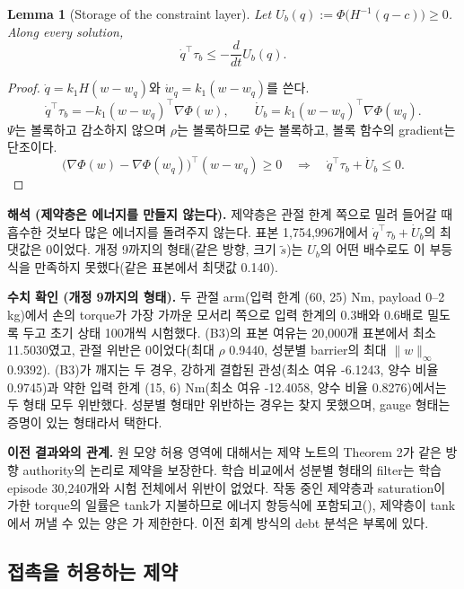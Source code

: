 \documentclass[11pt]{article}\usepackage[margin=1in]{geometry}\usepackage{amsmath,amssymb,amsthm,mathtools}\usepackage{graphicx}\graphicspath{{figures/}{../figures/}{figs/}{./}}\usepackage{enumitem}\usepackage{hyperref}\usepackage{cleveref}\usepackage{tikz}\usetikzlibrary{arrows.meta,positioning,calc,shapes.geometric}\usepackage{float}\usepackage{rotating}\usepackage[most]{tcolorbox}\usepackage{kotex}\usepackage{booktabs}\usepackage{longtable}\emergencystretch=1.6em\tolerance=2000 \crefname{assumption}{Assumption}{Assumptions}\Crefname{assumption}{Assumption}{Assumptions}\crefname{definition}{Definition}{Definitions}\Crefname{definition}{Definition}{Definitions}\crefname{proposition}{Proposition}{Propositions}\Crefname{proposition}{Proposition}{Propositions}\crefname{fact}{Fact}{Facts}\Crefname{fact}{Fact}{Facts} \newtheorem{assumption}{Assumption}\newtheorem{definition}{Definition}\newtheorem{lemma}{Lemma}\newtheorem{proposition}{Proposition}\newtheorem{theorem}{Theorem}\newtheorem{corollary}{Corollary}\newtheorem{fact}{Fact}\theoremstyle{remark}\newtheorem{remark}{Remark} \newcommand{\R}{\mathbb{R}}\newcommand{\xb}{\bar x}\newcommand{\Ab}{\bar A}\newcommand{\By}{\bar B_y}\newcommand{\U}{\mathcal U}\newcommand{\Z}{\mathcal Z}
\begin{document}
\begin{lemma}[Storage of the constraint layer]
\label{lem:barrier}
Let $U_b(q):=\Phi\big(H^{-1}(q-c)\big)\ge0$. Along every solution,
\[
\dot q^\top\tau_b\le-\frac{d}{dt}U_b(q) .
\]
\end{lemma}

\begin{proof}
$\dot q=k_1H(w-w_q)$와 $\dot w_q=k_1(w-w_q)$를 쓴다.
\[
\dot q^\top\tau_b=-k_1(w-w_q)^\top\nabla\Phi(w),\qquad \dot U_b=k_1(w-w_q)^\top\nabla\Phi(w_q) .
\]
$\Psi$는 볼록하고 감소하지 않으며 $\rho$는 볼록하므로 $\Phi$는 볼록하고, 볼록 함수의 gradient는 단조이다.
\[
\big(\nabla\Phi(w)-\nabla\Phi(w_q)\big)^\top(w-w_q)\ge0\quad\Longrightarrow\quad \dot q^\top\tau_b+\dot U_b\le0 .
\]
\end{proof}

\textbf{해석 (제약층은 에너지를 만들지 않는다).} 제약층은 관절 한계 쪽으로 밀려 들어갈 때 흡수한 것보다 많은 에너지를 돌려주지 않는다. 표본 1{,}754{,}996개에서 $\dot q^\top\tau_b+\dot U_b$의 최댓값은 0이었다. 개정 9까지의 형태(같은 방향, 크기 $\tilde s$)는 $U_b$의 어떤 배수로도 이 부등식을 만족하지 못했다(같은 표본에서 최댓값 0.140).

\textbf{수치 확인 (개정 9까지의 형태).} 두 관절 arm(입력 한계 (60, 25) Nm, payload 0--2 kg)에서 손의 torque가 가장 가까운 모서리 쪽으로 입력 한계의 0.3배와 0.6배로 밀도록 두고 초기 상태 100개씩 시험했다. (B3)의 표본 여유는 20{,}000개 표본에서 최소 11.5030였고, 관절 위반은 0이었다(최대 $\rho$ 0.9440, 성분별 barrier의 최대 $\|w\|_\infty$ 0.9392). (B3)가 깨지는 두 경우, 강하게 결합된 관성(최소 여유 -6.1243, 양수 비율 0.9745)과 약한 입력 한계 (15, 6) Nm(최소 여유 -12.4058, 양수 비율 0.8276)에서는 두 형태 모두 위반했다. 성분별 형태만 위반하는 경우는 찾지 못했으며, gauge 형태는 증명이 있는 형태라서 택한다.

\textbf{이전 결과와의 관계.} 원 모양 허용 영역에 대해서는 제약 노트의 Theorem 2가 같은 방향 authority의 논리로 제약을 보장한다. 학습 비교에서 성분별 형태의 filter는 학습 episode 30{,}240개와 시험 전체에서 위반이 없었다. 작동 중인 제약층과 saturation이 가한 torque의 일률은 tank가 지불하므로 에너지 항등식에 포함되고(), 제약층이 tank에서 꺼낼 수 있는 양은 가 제한한다. 이전 회계 방식의 debt 분석은 부록에 있다.

\subsection{접촉을 허용하는 제약}
\label{sec:contactcons}
\end{document}

